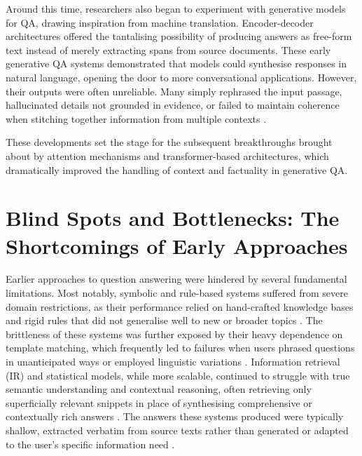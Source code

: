 \begin{spacing}{1.5}
Around this time, researchers also began to experiment with generative models for QA, drawing inspiration from machine translation. Encoder-decoder architectures offered the tantalising possibility of producing answers as free-form text instead of merely extracting spans from source documents. These early generative QA systems demonstrated that models could synthesise responses in natural language, opening the door to more conversational applications. However, their outputs were often unreliable. Many simply rephrased the input passage, hallucinated details not grounded in evidence, or failed to maintain coherence when stitching together information from multiple contexts \citep{caballero_brief_2021}.

These developments set the stage for the subsequent breakthroughs brought about by attention mechanisms and transformer-based architectures, which dramatically improved the handling of context and factuality in generative QA.

\section{Blind Spots and Bottlenecks: The Shortcomings of Early Approaches}
Earlier approaches to question answering were hindered by several fundamental limitations. Most notably, symbolic and rule-based systems suffered from severe domain restrictions, as their performance relied on hand-crafted knowledge bases and rigid rules that did not generalise well to new or broader topics \citep{alqifari_question_2019}. The brittleness of these systems was further exposed by their heavy dependence on template matching, which frequently led to failures when users phrased questions in unanticipated ways or employed linguistic variations \citep{hirschman_natural_2001}. Information retrieval (IR) and statistical models, while more scalable, continued to struggle with true semantic understanding and contextual reasoning, often retrieving only superficially relevant snippets in place of synthesising comprehensive or contextually rich answers \citep{alanazi_question_2021, diefenbach_core_2018}. The answers these systems produced were typically shallow, extracted verbatim from source texts rather than generated or adapted to the user’s specific information need \citep{hirschman_natural_2001,alqifari_question_2019}.


\end{spacing}
